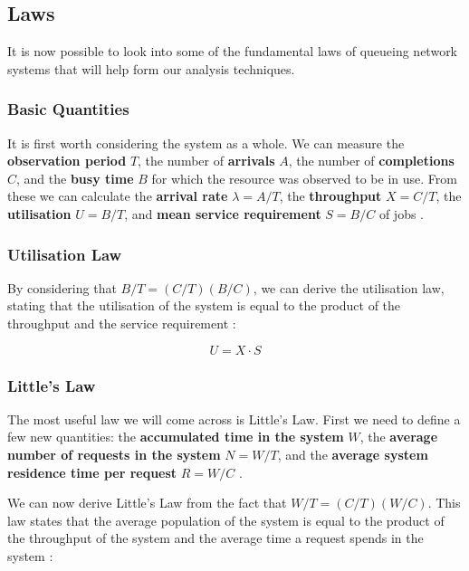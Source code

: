 \subsection{Laws}
\label{sec:bg-laws}

It is now possible to look into some of the fundamental laws of queueing network systems that will help form our analysis techniques.

\subsubsection*{Basic Quantities}

It is first worth considering the system as a whole. We can measure the \textbf{observation period} $T$, the number of \textbf{arrivals} $A$, the number of \textbf{completions} $C$, and the \textbf{busy time} $B$ for which the resource was observed to be in use. From these we can calculate the \textbf{arrival rate} $\lambda = A/T$, the \textbf{throughput} $X = C/T$, the \textbf{utilisation} $U = B/T$, and \textbf{mean service requirement} $S = B/C$ of jobs \cite{lazowska84}.

\subsubsection*{Utilisation Law}

By considering that $B/T = (C/T)(B/C)$, we can derive the utilisation law, stating that the utilisation of the system is equal to the product of the throughput and the service requirement \cite{lazowska84}:

\begin{equation}
U = X \cdot S
\label{eq:utilisation-law}
\end{equation}

\subsubsection*{Little's Law}

The most useful law we will come across is Little's Law. First we need to define a few new quantities: the \textbf{accumulated time in the system} $W$, the \textbf{average number of requests in the system} $N = W/T$, and the \textbf{average system residence time per request} $R = W/C$ \cite{lazowska84}.

We can now derive Little's Law from the fact that $W/T = (C/T)(W/C)$. This law states that the average population of the system is equal to the product of the throughput of the system and the average time a request spends in the system \cite{lazowska84}:

